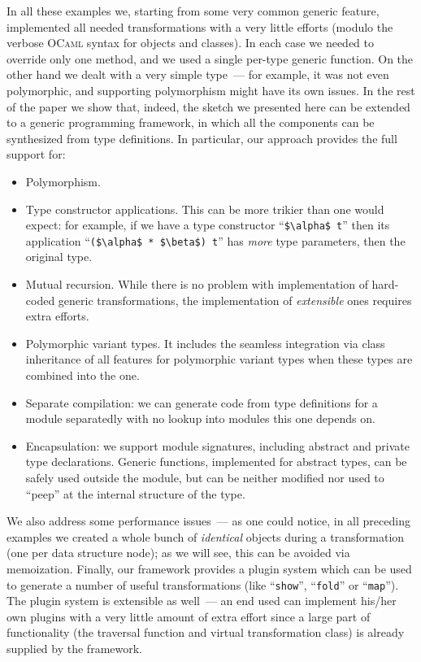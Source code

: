In all these examples we, starting from some very common generic feature, implemented all needed transformations with a very little efforts (modulo
the verbose \textsc{OCaml} syntax for objects and classes). In each case we needed to override only one method, and we used a single per-type generic
function. On the other hand we dealt with a very simple type~--- for example, it was not even polymorphic, and supporting polymorphism might have
its own issues. In the rest of the paper we show that, indeed, the sketch we presented here can be extended to a generic programming
framework, in which all the components can be synthesized from type definitions. In particular, our approach provides the full support for:

\begin{itemize}
\item Polymorphism.
\item Type constructor applications. This can be more trikier than one would expect: for example, if
  we have a type constructor ``\lstinline{$\alpha$ t}'' then its application ``\lstinline{($\alpha$ * $\beta$) t}'' has
  \emph{more} type parameters, then the original type.
\item Mutual recursion. While there is no problem with implementation of hard-coded generic transformations, the implementation of \emph{extensible} ones
  requires extra efforts.
\item Polymorphic variant types. It includes the seamless integration via class inheritance of all features
  for polymorphic variant types when these types are combined into the one.
\item Separate compilation: we can generate code from type definitions for a module separatedly with no lookup into
  modules this one depends on.
\item Encapsulation: we support module signatures, including abstract and private type declarations. Generic functions, implemented for
  abstract types, can be safely used outside the module, but can be neither modified nor used to ``peep'' at the internal structure of
  the type.  
\end{itemize}

We also address some performance issues~--- as one could notice, in all preceding examples we created a whole bunch of \emph{identical} objects during a
transformation (one per data structure node); as we will see, this can be avoided via memoization. Finally, our framework provides a plugin system which can be
used to generate a number of useful transformations (like ``\lstinline{show}'', ``\lstinline{fold}'' or ``\lstinline{map}''). The plugin system is
extensible as well~--- an end used can implement his/her own plugins with a very little amount of extra effort since a large part of functionality (the traversal
function and virtual transformation class) is already supplied by the framework. 
